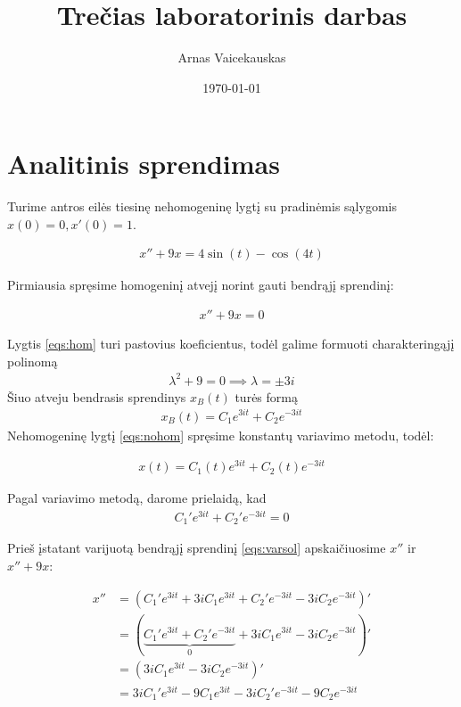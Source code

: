\documentclass[11pt]{article}
\title{ Trečias laboratorinis darbas}
\author{ Arnas Vaicekauskas }
\date{\today}
\begin{document}
\maketitle

\section{Analitinis sprendimas}

Turime antros eilės tiesinę nehomogeninę lygtį su pradinėmis sąlygomis $x(0)=0,x'(0)=1$.

\begin{align}
x''+9x=4\sin(t)-\cos(4t) \label{eqs:nohom}
\end{align}

Pirmiausia spręsime homogeninį atvejį norint gauti bendrąjį sprendinį:

\begin{align}
    x''+9x=0 \label{eqs:hom}
\end{align}

Lygtis \eqref{eqs:hom} turi pastovius koeficientus, 
todėl galime formuoti charakteringąjį polinomą
\begin{align*}
    \lambda^2+9=0\implies\lambda=\pm3i
\end{align*}
Šiuo atveju bendrasis sprendinys $x_B(t)$ turės formą 
\begin{align}
x_B(t)=C_1e^{3it}+C_2e^{-3it}
\end{align}
Nehomogeninę lygtį \eqref{eqs:nohom} spręsime
konstantų variavimo metodu, todėl:

\begin{align}
x(t)=C_1(t)e^{3it}+C_2(t)e^{-3it} \label{eqs:varsol}
\end{align}

Pagal variavimo metodą, darome prielaidą, kad 
\begin{align}
C_1'e^{3it}+C_2'e^{-3it}=0  \label{eqs:assumtion}
\end{align}

Prieš įstatant varijuotą bendrąjį sprendinį \eqref{eqs:varsol} apskaičiuosime $x''$ ir \\ $x''+9x$: 

\begin{align*}
x''&=(C_1'e^{3it}+3iC_1e^{3it}+C_2'e^{-3it}-3iC_2e^{-3it})'\\
&=(\underbrace{C_1'e^{3it}+C_2'e^{-3it}}_0+3iC_1e^{3it}-3iC_2e^{-3it})'\\
&=(3iC_1e^{3it}-3iC_2e^{-3it})'\\
&=3iC_1'e^{3it}-9C_1e^{3it}-3iC_2'e^{-3it}-9C_2e^{-3it}
\end{align*}
\end{document}
